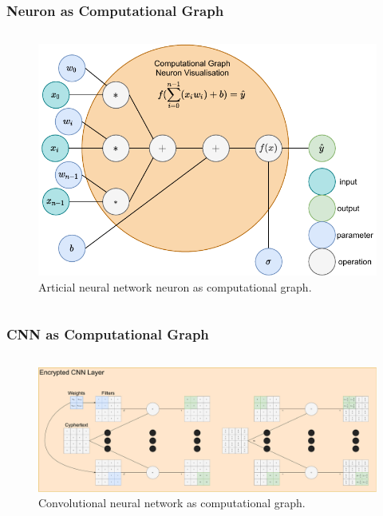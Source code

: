 \documentclass[aspectratio=169]{beamer}
\begin{document}
  \begin{frame}
    \frametitle{Neuron as Computational Graph}
    \begin{columns}
      \begin{column}{0.5\textwidth}
        \begin{figure}[th!]
          \centering
          \includegraphics[width=1\textwidth]{neuron_computational_graph.pdf}
          \caption{Articial neural network neuron as computational graph. \autocite{repository}}
          \label{fig:neuron}
        \end{figure}
      \end{column}
    \end{columns}
  \end{frame}

  \begin{frame}
    \frametitle{CNN as Computational Graph}
    \begin{columns}
      \begin{column}{1\textwidth}
        \begin{figure}[th!]
          \centering
          \includegraphics[width=1\textwidth]{cnn_computational_graph.pdf}
          \caption{Convolutional neural network as computational graph. \autocite{repository}}
          \label{fig:cnn_computational_graph}
        \end{figure}
      \end{column}
    \end{columns}
  \end{frame}
\end{document}
